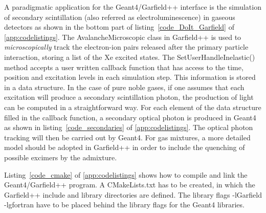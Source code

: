 \documentclass[preprint,12pt,sort&compress]{elsarticle}
\begin{document}
A paradigmatic application for the Geant4/Garfield++ interface is the simulation of secondary scintillation (also referred as electroluminescence) in gaseous detectors as shown in the bottom part of listing~\ref{code_DoIt_Garfield} of \ref{app:codelistings}. The AvalancheMicroscopic class in Garfield++ is used to \textit{microscopically} track the electron-ion pairs released after the primary particle interaction, storing a list of the Xe excited states. The SetUserHandleInelastic() method accepts a user written callback function that has access to the time, position and excitation levels in each simulation step. This information is stored in a data structure. In the case of pure noble gases, if one assumes that each excitation will produce a secondary scintillation photon, the production of light can be computed in a straightforward way. For each element of the data structure filled in the callback function, a secondary optical photon is produced in Geant4 as shown in listing~\ref{code_secondaries} of \ref{app:codelistings}. The optical photon tracking will then be carried out by Geant4. For gas mixtures, a more detailed model should be adopted in Garfield++ in order to include the quenching of possible excimers by the admixture. 

Listing~\ref{code_cmake} of \ref{app:codelistings} shows how to compile and link the Geant4/Garfield++ program. A CMakeLists.txt has to be created, in which the Garfield++ include and library directories are defined. The library flags -lGarfield -lgfortran have to be placed behind the library flags for the Geant4 libraries.
\end{document}

